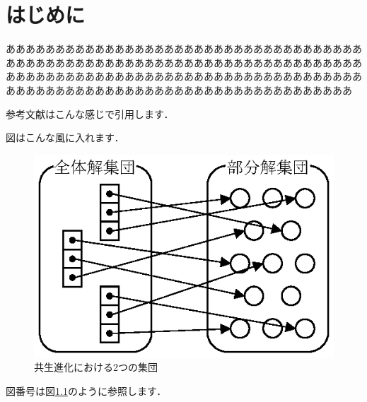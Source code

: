 \chapter{はじめに}
あああああああああああああああああああああああああああああああああああああああああああああああああああああああああああああああああああああああああああああああああああああああああああああああああああああああああああああああああああああああああああああああああああああああああああああああ

参考文献はこんな感じで引用します．
\cite{Quinlan96}
\cite{Quinlan89}
\cite{Quinlan93}
\cite{Iba94}
\cite{C50}
\cite{Nakayama00}
\cite{Otani06}
\cite{Otani04}
\cite{Saino88}
\cite{Ishibashi11}
\cite{Ushijima11}


図はこんな風に入れます．

\begin{figure}[tbhp]
\begin{center}
\includegraphics[scale=0.95]{images/se.eps}
\caption{共生進化における2つの集団}
\label{fig:02se}
\end{center}
\end{figure}

図番号は図\ref{fig:02se}のように参照します．
